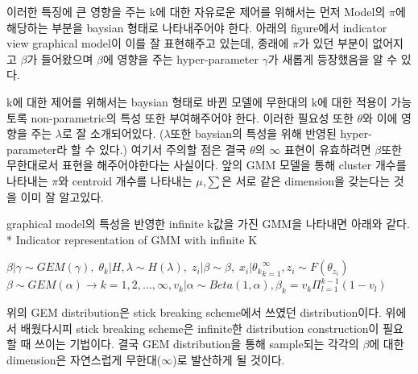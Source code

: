\documentclass[a4paper]{oblivoir}
\begin{document}
이러한 특징에 큰 영향을 주는 k에 대한 자유로운 제어를 위해서는 먼저 Model의 $\pi$에 해당하는 부분을 baysian 형태로 나타내주어야 한다. 아래의 figure에서 indicator view graphical model이 이를 잘 표현해주고 있는데, 종래에 $\pi$가 있던 부분이 없어지고 $\beta$가 들어왔으며 $\beta$에 영향을 주는 hyper-parameter $\gamma$가 새롭게 등장했음을 알 수 있다.

k에 대한 제어를 위해서는 baysian 형태로 바뀐 모델에 무한대의 k에 대한 적용이 가능토록 non-parametric의 특성 또한 부여해주어야 한다. 이러한 필요성 또한 $\theta$와 이에 영향을 주는 $\lambda$로 잘 소개되어있다. ($\lambda$또한 baysian의 특성을 위해 반영된 hyper-parameter라 할 수 있다.) 여기서 주의할 점은 결국 $\theta$의 $\infty$ 표현이 유효하려면 $\beta$또한 무한대로서 표현을 해주어야한다는 사실이다. 앞의 GMM 모델을 통해 cluster 개수를 나타내는 $\pi$와 centroid 개수를 나타내는 $\mu$,$\sum$은 서로 같은 dimension을 갖는다는 것을 이미 잘 알고있다.

graphical model의 특성을 반영한 infinite k값을 가진 GMM을 나타내면 아래와 같다.\\
* Indicator representation of GMM with infinite K
\begin{center}
$\beta|\gamma \sim GEM(\gamma), \; \theta_{k}|H,\lambda \sim H(\lambda),\;z_{i}|\beta \sim \beta,\;x_{i}|{\theta_{k}}^{\infty}_{k=1},z_{i} \sim F(\theta_{z_{i}})$\\
$\beta \sim GEM(\alpha) \rightarrow k=1,2,...,\infty, v_{k}|\alpha \sim Beta(1,\alpha), \beta_{k} = v_{k}\Pi^{k-1}_{l=1}(1-v_{l})$
\end{center}
위의 GEM distribution은 stick breaking scheme에서 쓰였던 distribution이다. 위에서 배웠다시피 stick breaking scheme은 infinite한 distribution construction이 필요할 때 쓰이는 기법이다. 결국 GEM distribution을 통해 sample되는 각각의 $\beta$에 대한 dimension은 자연스럽게 무한대($\infty$)로 발산하게 될 것이다.
\end{document}
